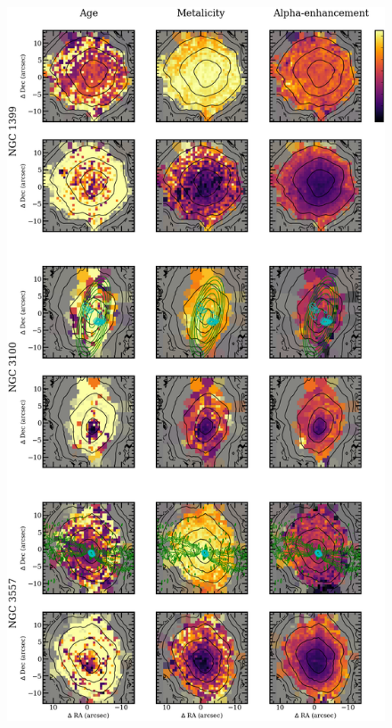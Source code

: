 		\begin{figure}
			\centering
			\includegraphics[height=0.94\textheight]{chapter4/vimos/pop3.png}
		\end{figure}
